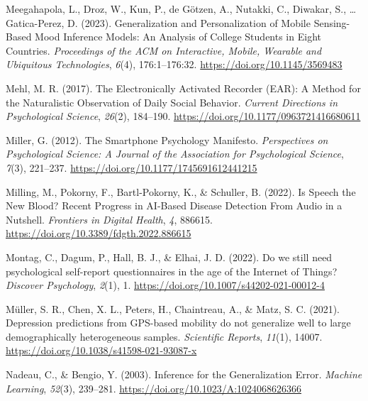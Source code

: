 \documentclass[
  english,
  man,floatsintext]{apa6}
\newlength{\cslhangindent}
\newenvironment{CSLReferences}[2] %
 {%
  \setlength{\parindent}{0pt}
  \ifodd #1 \everypar{\setlength{\hangindent}{\cslhangindent}}\ignorespaces\fi
  \ifnum #2 > 0
  \setlength{\parskip}{#2\baselineskip}
  \fi
 }%
 {}
\begin{document}
\begin{CSLReferences}{1}{0}
\leavevmode{}%
Meegahapola, L., Droz, W., Kun, P., de Götzen, A., Nutakki, C., Diwakar, S., \ldots{} Gatica-Perez, D. (2023). Generalization and {Personalization} of {Mobile Sensing-Based Mood Inference Models}: {An Analysis} of {College Students} in {Eight Countries}. \emph{Proceedings of the ACM on Interactive, Mobile, Wearable and Ubiquitous Technologies}, \emph{6}(4), 176:1--176:32. \url{https://doi.org/10.1145/3569483}

\leavevmode{}%
Mehl, M. R. (2017). The {Electronically Activated Recorder} ({EAR}): {A Method} for the {Naturalistic Observation} of {Daily Social Behavior}. \emph{Current Directions in Psychological Science}, \emph{26}(2), 184--190. \url{https://doi.org/10.1177/0963721416680611}

\leavevmode{}%
Miller, G. (2012). The {Smartphone Psychology Manifesto}. \emph{Perspectives on Psychological Science: A Journal of the Association for Psychological Science}, \emph{7}(3), 221--237. \url{https://doi.org/10.1177/1745691612441215}

\leavevmode{}%
Milling, M., Pokorny, F., Bartl-Pokorny, K., \& Schuller, B. (2022). Is {Speech} the {New Blood}? {Recent Progress} in {AI-Based Disease Detection From Audio} in a {Nutshell}. \emph{Frontiers in Digital Health}, \emph{4}, 886615. \url{https://doi.org/10.3389/fdgth.2022.886615}

\leavevmode{}%
Montag, C., Dagum, P., Hall, B. J., \& Elhai, J. D. (2022). Do we still need psychological self-report questionnaires in the age of the {Internet} of {Things}? \emph{Discover Psychology}, \emph{2}(1), 1. \url{https://doi.org/10.1007/s44202-021-00012-4}

\leavevmode{}%
Müller, S. R., Chen, X. L., Peters, H., Chaintreau, A., \& Matz, S. C. (2021). Depression predictions from {GPS-based} mobility do not generalize well to large demographically heterogeneous samples. \emph{Scientific Reports}, \emph{11}(1), 14007. \url{https://doi.org/10.1038/s41598-021-93087-x}

\leavevmode{}%
Nadeau, C., \& Bengio, Y. (2003). Inference for the {Generalization Error}. \emph{Machine Learning}, \emph{52}(3), 239--281. \url{https://doi.org/10.1023/A:1024068626366}


\end{CSLReferences}
\end{document}
